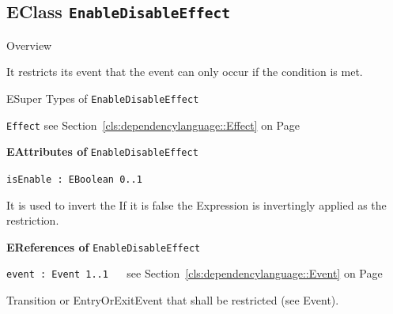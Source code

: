 \subsection{EClass \bfseries \texttt{EnableDisableEffect}\normalfont}
\label{cls:dependencylanguage::EnableDisableEffect} 
	
	\begin{longdescription}
		\item[Overview] 		
				

	

		It restricts its event that the event can only occur if the condition is met.
	
		\item[ESuper Types of \texttt{EnableDisableEffect}] ~
			\begin{longdescription}
				\item[\texttt{Effect}] see Section~\ref{cls:dependencylanguage::Effect} on Page~\pageref{cls:dependencylanguage::Effect}						\end{longdescription}
		
	
			\item[\textbf{EAttributes of} \texttt{EnableDisableEffect}] ~
			\begin{longdescription}
	\item[\texttt{isEnable : EBoolean \symbol{"5B}0..1\symbol{"5D}
}] ~
	
	
	\nopagebreak
		
				

	

		It is used to invert the 
If it is false the Expression is invertingly applied as the restriction.		
			\end{longdescription}
			\item[\textbf{EReferences of} \texttt{EnableDisableEffect}] ~
			\begin{longdescription}
	\item[\texttt{event : Event \symbol{"5B}1..1\symbol{"5D}
}] ~
	see Section~\ref{cls:dependencylanguage::Event} on Page~\pageref{cls:dependencylanguage::Event}
	
	\nopagebreak
		
				

	

		Transition or EntryOrExitEvent that shall be restricted (see Event).		
			\end{longdescription}
	
	\end{longdescription}
	

